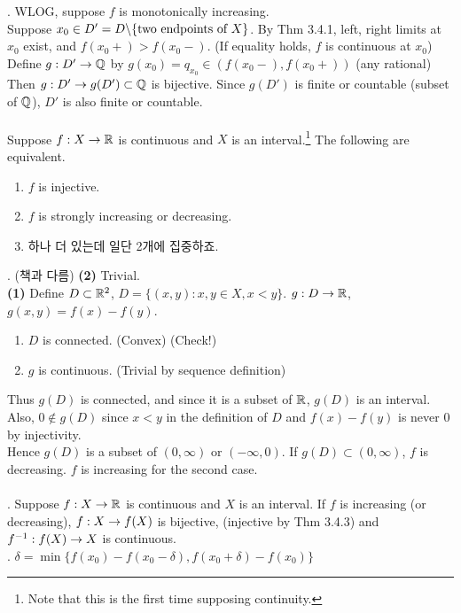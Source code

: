 \pf. WLOG, suppose $f$ is monotonically increasing.\\
Suppose $x_0\in D' = D\backslash \{\text{two endpoints of } X\}$. By Thm 3.4.1, left, right limits at $x_0$ exist, and $f(x_0+) > f(x_0-)$. (If equality holds, $f$ is continuous at $x_0$)\\
Define $g: D'\rightarrow \mathbb{Q}$ by $g(x_0) = q_{x_0}\in (f(x_0-), f(x_0+))$ (any rational) Then $g:D'\rightarrow g(D') \subset \mathbb{Q}$ is bijective. Since $g(D')$ is finite or countable (subset of $\mathbb{Q}$), $D'$ is also finite or countable.\\
\\
 Suppose $f:X\rightarrow\mathbb{R}$ is continuous and $X$ is an interval.\footnote{Note that this is the first time supposing continuity.} The following are equivalent.
\begin{enumerate}
	\item $f$ is injective.
	\item $f$ is strongly increasing or decreasing.
	\item 하나 더 있는데 일단 2개에 집중하죠.
\end{enumerate}
\pf. (책과 다름) \textbf{(2)} Trivial.\\
\textbf{(1)} Define $D\subset \mathbb{R}^2$, $D = \{(x, y) : x, y\in X, x<y\}$. $g:D\rightarrow \mathbb{R}$, $g(x, y) = f(x) - f(y)$.
\begin{enumerate}
	\item $D$ is connected. (Convex) (Check!)
	\item $g$ is continuous. (Trivial by sequence definition)
\end{enumerate}
Thus $g(D)$ is connected, and since it is a subset of $\mathbb{R}$, $g(D)$ is an interval. Also, $0\notin g(D)$ since $x<y$ in the definition of $D$ and $f(x)-f(y)$ is never 0 by injectivity.\\
Hence $g(D)$ is a subset of $(0, \infty)$ or $(-\infty, 0)$. If $g(D)\subset (0, \infty)$, $f$ is decreasing. $f$ is increasing for the second case.\\
\\
\rmk. Suppose $f:X\rightarrow \mathbb{R}$ is continuous and $X$ is an interval. If $f$ is increasing (or decreasing), $f:X\rightarrow f(X)$ is bijective, (injective by Thm 3.4.3) and $f^{-1}:f(X)\rightarrow X$ is continuous.\\
\pf. $\delta = \min\{f(x_0) - f(x_0-\delta), f(x_0+\delta) - f(x_0) \}$








\pagebreak